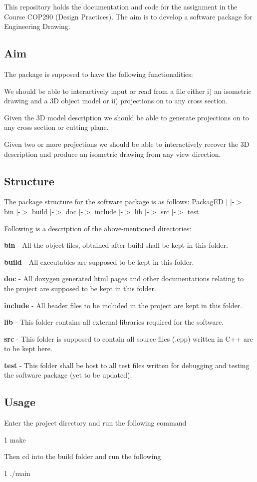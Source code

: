 This repository holds the documentation and code for the assignment in the Course C\+O\+P290 (Design Practices). The aim is to develop a software package for Engineering Drawing.

\subsection*{Aim}

The package is supposed to have the following functionalities\+:
\begin{DoxyEnumerate}
\item We should be able to interactively input or read from a file either i) an isometric drawing and a 3D object model or ii) projections on to any cross section.
\item Given the 3D model description we should be able to generate projections on to any cross section or cutting plane.
\item Given two or more projections we should be able to interactively recover the 3D description and produce an isometric drawing from any view direction.
\end{DoxyEnumerate}

\subsection*{Structure}

The package structure for the software package is as follows\+: Packag\+ED $\vert$ $\vert$-\/$>$ bin $\vert$-\/$>$ build $\vert$-\/$>$ doc $\vert$-\/$>$ include $\vert$-\/$>$ lib $\vert$-\/$>$ src $\vert$-\/$>$ test

Following is a description of the above-\/mentioned directories\+:
\begin{DoxyEnumerate}
\item {\bfseries bin} -\/ All the object files, obtained after build shall be kept in this folder.
\item {\bfseries build} -\/ All executables are supposed to be kept in this folder.
\item {\bfseries doc} -\/ All doxygen generated html pages and other documentations relating to the project are supposed to be kept in this folder.
\item {\bfseries include} -\/ All header files to be included in the project are kept in this folder.
\item {\bfseries lib} -\/ This folder contains all external libraries required for the software.
\item {\bfseries src} -\/ This folder is supposed to contain all source files (.cpp) written in C++ are to be kept here.
\item {\bfseries test} -\/ This folder shall be host to all test files written for debugging and testing the software package (yet to be updated).
\end{DoxyEnumerate}

\subsection*{Usage}

Enter the project directory and run the following command 
\begin{DoxyCode}
1 make
\end{DoxyCode}
 Then cd into the build folder and run the following 
\begin{DoxyCode}
1 ./main
\end{DoxyCode}
 